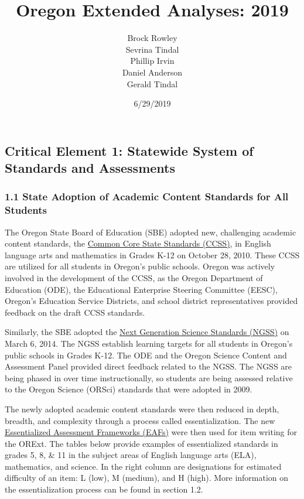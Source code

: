 \documentclass[]{article}
\title{Oregon Extended Analyses: 2019}
\author{Brock Rowley \\ Sevrina Tindal \\ Phillip Irvin \\ Daniel Anderson \\ Gerald Tindal}
\date{6/29/2019}
\begin{document}
\maketitle

{
\setcounter{tocdepth}{5}
\tableofcontents
}
\hypertarget{critical-element-1-statewide-system-of-standards-and-assessments}{%
\subsection{Critical Element 1: Statewide System of Standards and
Assessments}\label{critical-element-1-statewide-system-of-standards-and-assessments}}

\hypertarget{state-adoption-of-academic-content-standards-for-all-students}{%
\subsubsection{1.1 State Adoption of Academic Content Standards for All
Students}\label{state-adoption-of-academic-content-standards-for-all-students}}

The Oregon State Board of Education (SBE) adopted new, challenging
academic content standards, the
\color{link}\href{https://www.oregon.gov/ode/educator-resources/standards/Pages/default.aspx}{Common
Core State Standards (CCSS)}\color{black}, in English language arts and
mathematics in Grades K-12 on October 28, 2010. These CCSS are utilized
for all students in Oregon's public schools. Oregon was actively
involved in the development of the CCSS, as the Oregon Department of
Education (ODE), the Educational Enterprise Steering Committee (EESC),
Oregon's Education Service Districts, and school district
representatives provided feedback on the draft CCSS standards.

Similarly, the SBE adopted the
\color{link}\href{https://www.oregon.gov/ode/educator-resources/standards/science/Pages/Science-Standards.aspx}{Next
Generation Science Standards (NGSS)} \color{black} on March 6, 2014. The
NGSS establish learning targets for all students in Oregon's public
schools in Grades K-12. The ODE and the Oregon Science Content and
Assessment Panel provided direct feedback related to the NGSS. The NGSS
are being phased in over time instructionally, so students are being
assessed relative to the Oregon Science (ORSci) standards that were
adopted in 2009.

The newly adopted academic content standards were then reduced in depth,
breadth, and complexity through a process called essentialization. The
new
\color{link}\href{http://www.brtprojects.org/publications/training-modules}{Essentialized
Assessment Frameworks (EAFs)} \color{black} were then used for item
writing for the ORExt. The tables below provide examples of
essentialized standards in grades 5, 8, \& 11 in the subject areas of
English language arts (ELA), mathematics, and science. In the right
column are designations for estimated difficulty of an item: L (low), M
(medium), and H (high). More information on the essentialization process
can be found in section 1.2.
\end{document}
